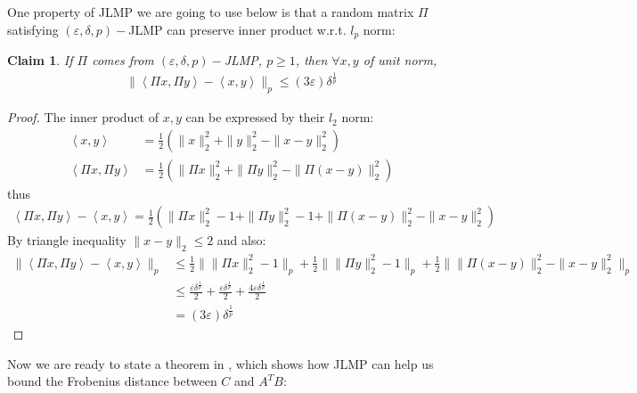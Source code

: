 \documentclass[11pt]{article}
\DeclareMathOperator*{\E}{\mathbb{E}}
\newcommand{\eps}{\varepsilon}
\newcommand{\inprod}[1]{\left\langle #1 \right\rangle}
\newtheorem{claim}[theorem]{Claim}
\begin{document}
One property of JLMP we are going to use below is that a random matrix $\Pi$ satisfying $(\eps,\delta,p)-$JLMP can preserve inner product w.r.t. $l_p$ norm:
\begin{claim}
\label{clm:inprodJL}
If $\Pi$ comes from $(\eps,\delta,p)-$JLMP, $p\geq 1$, then $\forall x,y$ of unit norm,
\begin{align*}
\|\inprod{\Pi x,\Pi y}-\inprod{x,y}\|_p \leq (3\eps)\delta^{\frac{1}{p}}
\end{align*}
\end{claim}
\begin{proof}
The inner product of ${x,y}$ can be expressed by their $l_2$ norm:
\begin{align}
\label{eq:inprod1}
\inprod{x,y} &= \frac{1}{2}(\|x\|_2^2+\|y\|_2^2-\|x-y\|_2^2)\\
\label{eq:inprod2}
\inprod{\Pi x,\Pi y} &= \frac{1}{2}(\|\Pi x\|_2^2+\|\Pi y\|_2^2-\|\Pi(x-y)\|_2^2)
\end{align}
thus
\begin{align*}
\inprod{\Pi x,\Pi y} - \inprod{x,y} = \frac{1}{2}(\|\Pi x\|_2^2-1+\|\Pi y\|_2^2-1+\|\Pi(x-y)\|_2^2-\|x-y\|_2^2)
\end{align*}
By triangle inequality $\|x-y\|_2\leq 2$ and also:
\begin{align*}
\|\inprod{\Pi x,\Pi y} - \inprod{x,y}\|_p &\leq \frac{1}{2}\big\| \|\Pi x\|_2^2-1 \big\|_p + \frac{1}{2}\big\| \|\Pi y\|_2^2-1 \big\|_p + \frac{1}{2}\big\| \|\Pi(x-y)\|_2^2-\|x-y\|_2^2 \big\|_p \\
&\leq \frac{\eps\delta^{\frac{1}{p}}}{2}+\frac{\eps\delta^{\frac{1}{p}}}{2}+\frac{4\eps\delta^{\frac{1}{p}}}{2}\\
&= (3\eps)\delta^{\frac{1}{p}}
\end{align*}
\end{proof}
Now we are ready to state a theorem in \cite{KaneN14}, which shows how JLMP can help us bound the Frobenius distance between $C$ and $A^TB$:
\end{document}
